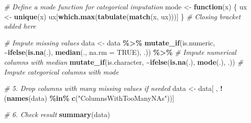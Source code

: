 \documentclass[
]{article}
\newenvironment{Shaded}{\begin{snugshade}}{\end{snugshade}}
\newcommand{\AttributeTok}[1]{\textcolor[rgb]{0.13,0.29,0.53}{#1}}
\newcommand{\CommentTok}[1]{\textcolor[rgb]{0.56,0.35,0.01}{\textit{#1}}}
\newcommand{\ConstantTok}[1]{\textcolor[rgb]{0.56,0.35,0.01}{#1}}
\newcommand{\ControlFlowTok}[1]{\textcolor[rgb]{0.13,0.29,0.53}{\textbf{#1}}}
\newcommand{\FunctionTok}[1]{\textcolor[rgb]{0.13,0.29,0.53}{\textbf{#1}}}
\newcommand{\NormalTok}[1]{#1}
\newcommand{\OtherTok}[1]{\textcolor[rgb]{0.56,0.35,0.01}{#1}}
\newcommand{\SpecialCharTok}[1]{\textcolor[rgb]{0.81,0.36,0.00}{\textbf{#1}}}
\newcommand{\StringTok}[1]{\textcolor[rgb]{0.31,0.60,0.02}{#1}}
\begin{document}
\begin{Shaded}
\begin{Highlighting}[]
\CommentTok{\# Define a mode function for categorical imputation}
\NormalTok{mode }\OtherTok{\textless{}{-}} \ControlFlowTok{function}\NormalTok{(x) \{}
\NormalTok{  ux }\OtherTok{\textless{}{-}} \FunctionTok{unique}\NormalTok{(x)}
\NormalTok{  ux[}\FunctionTok{which.max}\NormalTok{(}\FunctionTok{tabulate}\NormalTok{(}\FunctionTok{match}\NormalTok{(x, ux)))]}
\NormalTok{\} }\CommentTok{\# Closing bracket added here}

\CommentTok{\# Impute missing values}
\NormalTok{data }\OtherTok{\textless{}{-}}\NormalTok{ data }\SpecialCharTok{\%\textgreater{}\%}
  \FunctionTok{mutate\_if}\NormalTok{(is.numeric, }\SpecialCharTok{\textasciitilde{}}\FunctionTok{ifelse}\NormalTok{(}\FunctionTok{is.na}\NormalTok{(.), }\FunctionTok{median}\NormalTok{(., }\AttributeTok{na.rm =} \ConstantTok{TRUE}\NormalTok{), .)) }\SpecialCharTok{\%\textgreater{}\%}  \CommentTok{\# Impute numerical columns with median}
  \FunctionTok{mutate\_if}\NormalTok{(is.character, }\SpecialCharTok{\textasciitilde{}}\FunctionTok{ifelse}\NormalTok{(}\FunctionTok{is.na}\NormalTok{(.), }\FunctionTok{mode}\NormalTok{(.), .))  }\CommentTok{\# Impute categorical columns with mode}

\CommentTok{\# 5. Drop columns with many missing values if needed}
\NormalTok{data }\OtherTok{\textless{}{-}}\NormalTok{ data[ , }\SpecialCharTok{!}\NormalTok{(}\FunctionTok{names}\NormalTok{(data) }\SpecialCharTok{\%in\%} \FunctionTok{c}\NormalTok{(}\StringTok{"ColumnsWithTooManyNAs"}\NormalTok{))]}

\CommentTok{\# 6. Check result}
\FunctionTok{summary}\NormalTok{(data)}
\end{Highlighting}
\end{Shaded}
\end{document}
